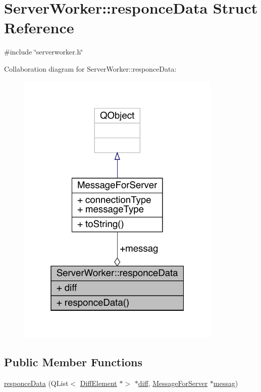 \hypertarget{a00189}{}\section{Server\+Worker\+:\+:responce\+Data Struct Reference}
\label{a00189}


{\ttfamily \#include \char`\"{}serverworker.\+h\char`\"{}}



Collaboration diagram for Server\+Worker\+:\+:responce\+Data\+:
\nopagebreak
\begin{figure}[H]
\begin{center}
\leavevmode
\includegraphics[width=277pt]{d6/daa/a00187}
\end{center}
\end{figure}
\subsection*{Public Member Functions}
\begin{DoxyCompactItemize}
\item 
\hyperlink{a00189_a7a5eda32e5aa3266882ecc57d89ff798}{responce\+Data} (Q\+List$<$ \hyperlink{a00141}{Diff\+Element} $\ast$$>$ $\ast$\hyperlink{a00189_abcaa9482893ea18f129f3b821e4b4ec8}{diff}, \hyperlink{a00121}{Message\+For\+Server} $\ast$\hyperlink{a00189_a0915cfbfe5884aecde59303745ced47b}{messag})
\end{DoxyCompactItemize}
